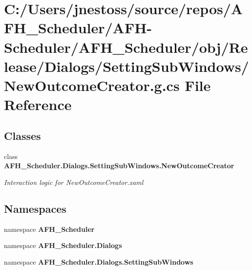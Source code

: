 \section{C\+:/\+Users/jnestoss/source/repos/\+A\+F\+H\+\_\+\+Scheduler/\+A\+F\+H-\/\+Scheduler/\+A\+F\+H\+\_\+\+Scheduler/obj/\+Release/\+Dialogs/\+Setting\+Sub\+Windows/\+New\+Outcome\+Creator.g.\+cs File Reference}
\label{_release_2_dialogs_2_setting_sub_windows_2_new_outcome_creator_8g_8cs}
\subsection*{Classes}
\begin{DoxyCompactItemize}
\item 
class \textbf{ A\+F\+H\+\_\+\+Scheduler.\+Dialogs.\+Setting\+Sub\+Windows.\+New\+Outcome\+Creator}
\begin{DoxyCompactList}\small\item\em Interaction logic for New\+Outcome\+Creator.\+xaml \end{DoxyCompactList}\end{DoxyCompactItemize}
\subsection*{Namespaces}
\begin{DoxyCompactItemize}
\item 
namespace \textbf{ A\+F\+H\+\_\+\+Scheduler}
\item 
namespace \textbf{ A\+F\+H\+\_\+\+Scheduler.\+Dialogs}
\item 
namespace \textbf{ A\+F\+H\+\_\+\+Scheduler.\+Dialogs.\+Setting\+Sub\+Windows}
\end{DoxyCompactItemize}
